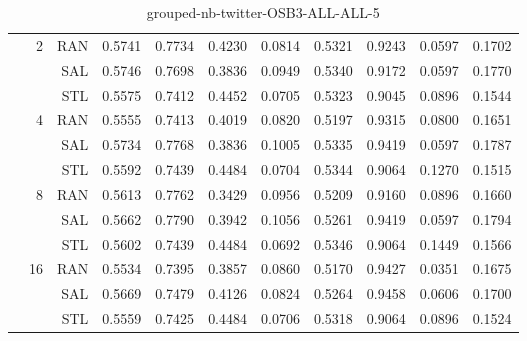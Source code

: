\begin{center}
\begin{table}[htbp]
\begin{tabular}{ | r | r | r | r | r | r | r | r | r | r | r |}
 & \multirow{3}{*}{2} & RAN & 0.5741 & 0.7734 & 0.4230 & 0.0814 & 0.5321 & 0.9243 & 0.0597 & 0.1702\\ \cline{3-11}
 &   & SAL & 0.5746 & 0.7698 & 0.3836 & 0.0949 & 0.5340 & 0.9172 & 0.0597 & 0.1770\\ \cline{3-11}
 &   & STL & 0.5575 & 0.7412 & 0.4452 & 0.0705 & 0.5323 & 0.9045 & 0.0896 & 0.1544\\ \cline{2-11}
 & \multirow{3}{*}{4} & RAN & 0.5555 & 0.7413 & 0.4019 & 0.0820 & 0.5197 & 0.9315 & 0.0800 & 0.1651\\ \cline{3-11}
 &   & SAL & 0.5734 & 0.7768 & 0.3836 & 0.1005 & 0.5335 & 0.9419 & 0.0597 & 0.1787\\ \cline{3-11}
 &   & STL & 0.5592 & 0.7439 & 0.4484 & 0.0704 & 0.5344 & 0.9064 & 0.1270 & 0.1515\\ \cline{2-11}
 & \multirow{3}{*}{8} & RAN & 0.5613 & 0.7762 & 0.3429 & 0.0956 & 0.5209 & 0.9160 & 0.0896 & 0.1660\\ \cline{3-11}
 &   & SAL & 0.5662 & 0.7790 & 0.3942 & 0.1056 & 0.5261 & 0.9419 & 0.0597 & 0.1794\\ \cline{3-11}
 &   & STL & 0.5602 & 0.7439 & 0.4484 & 0.0692 & 0.5346 & 0.9064 & 0.1449 & 0.1566\\ \cline{2-11}
 & \multirow{3}{*}{16} & RAN & 0.5534 & 0.7395 & 0.3857 & 0.0860 & 0.5170 & 0.9427 & 0.0351 & 0.1675\\ \cline{3-11}
 &   & SAL & 0.5669 & 0.7479 & 0.4126 & 0.0824 & 0.5264 & 0.9458 & 0.0606 & 0.1700\\ \cline{3-11}
 &   & STL & 0.5559 & 0.7425 & 0.4484 & 0.0706 & 0.5318 & 0.9064 & 0.0896 & 0.1524\\ \cline{2-11}
\hline
\end{tabular}
\caption{grouped-nb-twitter-OSB3-ALL-ALL-5}
\end{table}
\end{center}

